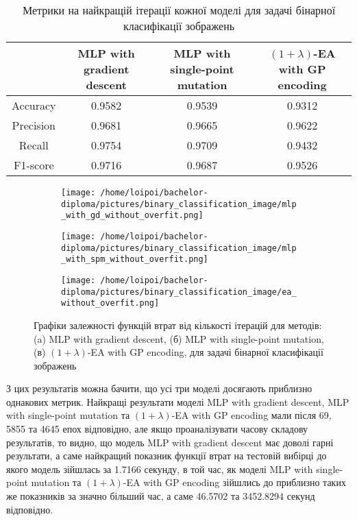 \begin{table}[ht]
	\centering
	\begin{adjustbox}{max width=\textwidth}
		\begin{tabular}{|c|c|c|c|}
			\hline 
			& MLP with gradient descent & MLP with single-point mutation & $(1+\lambda)$-EA with GP encoding \\
			\hline 
			Accuracy & 0.9582 & 0.9539 & 0.9312 \\
			\hline 
			Precision & 0.9681 & 0.9665 & 0.9622 \\
			\hline
			Recall & 0.9754 & 0.9709 & 0.9432 \\
			\hline
			F1-score & 0.9716 & 0.9687 & 0.9526 \\
			\hline
		\end{tabular}
	\end{adjustbox}
	\caption{Метрики на найкращій ітерації кожної моделі для задачі бінарної класифікації зображень}
	\label{metrics_bc_id_results}
\end{table}

\begin{figure}[ht]
	\centering
	\begin{subfigure}[b]{0.32\textwidth}    
		\texttt{[image: /home/loipoi/bachelor-diploma/pictures/binary\_classification\_image/mlp\_with\_gd\_without\_overfit.png]}
		\caption{}
	\end{subfigure}	
	\begin{subfigure}[b]{0.32\textwidth}
		\texttt{[image: /home/loipoi/bachelor-diploma/pictures/binary\_classification\_image/mlp\_with\_spm\_without\_overfit.png]}
		\caption{}
	\end{subfigure}	
	\begin{subfigure}[b]{0.32\textwidth}
		\texttt{[image: /home/loipoi/bachelor-diploma/pictures/binary\_classification\_image/ea\_without\_overfit.png]}
		\caption{}
	\end{subfigure}
	
	\caption{Графіки залежності функцій втрат від кількості ітерацій для методів: (a) MLP with gradient descent, (б) MLP with single-point mutation, (в) $(1+\lambda)$-EA with GP encoding, для задачі бінарної класифікації зображень}
	\label{fig_losses_bc_id}
\end{figure}

З цих результатів можна бачити, що усі три моделі досягають приблизно однакових метрик. Найкращі результати моделі MLP with gradient descent, MLP with single-point mutation та $(1+\lambda)$-EA with GP encoding мали після 69, 5855 та 4645 епох відповідно, але якщо проаналізувати часову складову результатів, то видно, що модель MLP with gradient descent має доволі гарні результати, а саме найкращий показник функції втрат на тестовій вибірці до якого модель зійшлась за 1.7166 секунду, в той час, як моделі MLP with single-point mutation та $(1+\lambda)$-EA with GP encoding зійшлись до приблизно таких же показників за значно більший час, а саме 46.5702 та 3452.8294 секунд відповідно.

